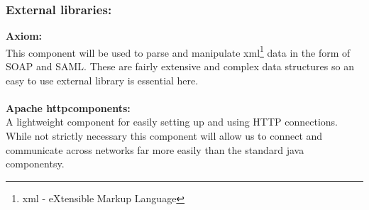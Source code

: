     \subsubsection{External libraries:}
\indent \indent \textbf{Axiom:}\\
This component will be used to parse and manipulate \gls{xml}\footnote{\gls{xml} - eXtensible Markup Language} data in the form of SOAP and SAML. These are fairly extensive and complex data structures so an easy to use external library is essential here.
\\\\

\indent \textbf{Apache \gls{httpcomponents}:}\\
A lightweight component for easily setting up and using HTTP connections. While not strictly necessary this component will allow us to connect and communicate across networks far more easily than the standard java componentsy.

